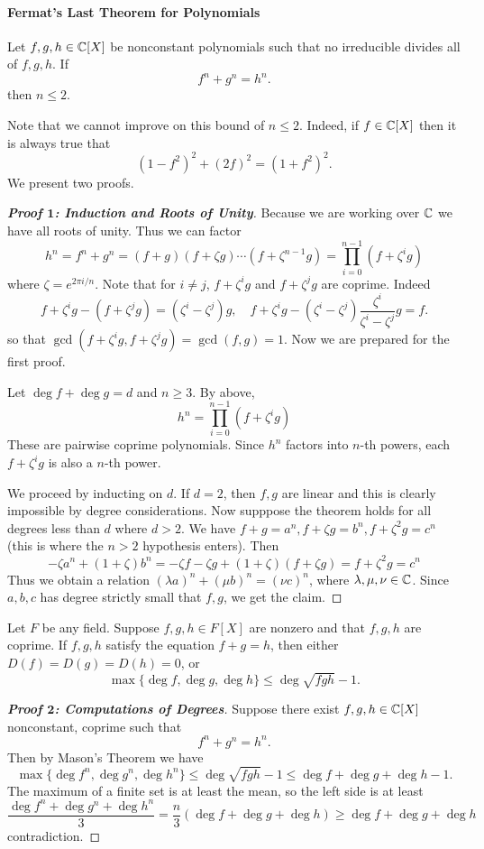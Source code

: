 \paragraph{Fermat's Last Theorem for Polynomials}
\begin{theorem}
Let $f,g,h\in\mathbb{C}[X]$ be nonconstant polynomials such that no irreducible divides all of $f,g,h$. If
\[f^n+g^n=h^n.\]
then $n\leq 2$.
\end{theorem}
Note that we cannot improve on this bound of $n\leq2$. Indeed, if $f\in\mathbb{C}[X]$ then it is always true that
\[(1-f^2)^2+(2f)^2=(1+f^2)^2.\]
We present two proofs.
\begin{proof}[\textbf{Proof $\bm{1}$: Induction and Roots of Unity}]
Because we are working over $\mathbb{C}$ we have all roots of unity. Thus we can factor
\[h^n=f^n+g^n=(f+g)(f+\zeta g)\cdots(f+\zeta^{n-1}g)=\prod_{i=0}^{n-1}(f+\zeta^ig)\]
where $\zeta=e^{2\pi i/n}$. Note that for $i\neq j$, $f+\zeta^ig$ and $f+\zeta^jg$ are coprime. Indeed
\[f+\zeta^ig-(f+\zeta^jg)=(\zeta^i-\zeta^j)g,\quad f+\zeta^ig-(\zeta^i-\zeta^j)\frac{\zeta^i}{\zeta^i-\zeta^j}g=f.\]
so that $\gcd(f+\zeta^ig,f+\zeta^jg)=\gcd(f,g)=1$. Now we are prepared for the first proof.\par
Let $\deg f+\deg g=d$ and $n\geq3$. By above,
\[h^n=\prod_{i=0}^{n-1}(f+\zeta^ig)\]
These are pairwise coprime polynomials. Since $h^n$ factors into $n$-th powers, each $f+\zeta^ig$ is also a $n$-th power.\par
We proceed by inducting on $d$. If $d=2$, then $f,g$ are linear and this is clearly impossible by degree considerations. Now supppose the theorem holds for all degrees less than $d$ where $d>2$. We have $f+g=a^n,f+\zeta g=b^n,f+\zeta^2g=c^n$ (this is where the $n>2$ hypothesis enters). Then
\[-\zeta a^n+(1+\zeta)b^n=-\zeta f-\zeta g+(1+\zeta)(f+\zeta g)=f+\zeta^2g=c^n\]
Thus we obtain a relation $(\lambda a)^n+(\mu b)^n=(\nu c)^n$, where $\lambda,\mu,\nu\in\mathbb{C}$. Since $a,b,c$ has degree strictly small that $f,g$, we get the claim. 
\end{proof}
\begin{theorem}
Let $F$ be any field. Suppose $f,g,h\in F[X]$ are nonzero and that $f,g,h$ are coprime. If $f,g,h$ satisfy the equation $f+g=h$, then either $D(f)=D(g)=D(h)=0$, or
\[\max\{\deg f,\deg g,\deg h\}\leq\deg\sqrt{fgh}-1.\]
\end{theorem}
\begin{proof}[\textbf{Proof $\bm{2}$: Computations of Degrees}]
Suppose there exist $f,g,h\in\mathbb{C}[X]$ nonconstant, coprime such that
\[f^n+g^n=h^n.\]
Then by Mason's Theorem we have 
\[\max\{\deg f^n,\deg g^n,\deg h^n\}\leq\deg\sqrt{fgh}-1\leq\deg f+\deg g+\deg h-1.\]
The maximum of a finite set is at least the mean, so the left side is at least
\[\frac{\deg f^n+\deg g^n+\deg h^n}{3}=\frac{n}{3}(\deg f+\deg g+\deg h)\geq\deg f+\deg g+\deg h\]
contradiction.
\end{proof}
